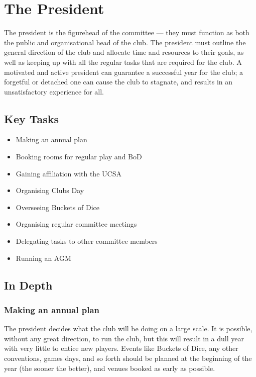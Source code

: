 \section{The President}

The president is the figurehead of the committee --- they must function as both the public and organisational head of the club. The president must outline the general direction of the club and allocate time and resources to their goals, as well as keeping up with all the regular tasks that are required for the club. A motivated and active president can guarantee a successful year for the club; a forgetful or detached one can cause the club to stagnate, and results in an unsatisfactory experience for all.

\subsection{Key Tasks}

\begin{itemize}
  \item Making an annual plan
  \item Booking rooms for regular play and BoD
  \item Gaining affiliation with the UCSA
  \item Organising Clubs Day
  \item Overseeing Buckets of Dice
  \item Organising regular committee meetings
  \item Delegating tasks to other committee members
  \item Running an AGM
\end{itemize}

\subsection{In Depth}

\subsubsection{Making an annual plan}

The president decides what the club will be doing on a large scale. It is possible, without any great direction, to run the club, but this will result in a dull year with very little to entice new players. Events like Buckets of Dice, any other conventions, games days, and so forth should be planned at the beginning of the year (the sooner the better), and venues booked as early as possible.

